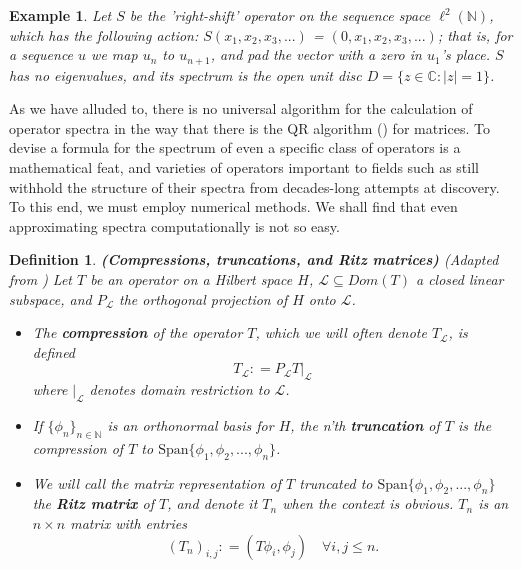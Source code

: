 \documentclass{article}
\newtheorem*{definition}{Definition}
\newtheorem{example}{Example}
\newcommand{\1}{\mathbf{1}} %
\newcommand{\eqdef}{\mathrel{\mathop:}=} %
\begin{document}
\begin{example}
Let $S$ be the 'right-shift' operator on the sequence space $\ell^2(\mathbb{N})$, which has the following action:
$S(x_1, x_2, x_3, ...)$ = $(0, x_1, x_2, x_3, ...)$; that is, for a sequence $u$ we map $u_n$ to $u_{n+1}$, and pad the vector with a zero in $u_1$'s place.
$S$ has no eigenvalues, and its spectrum is the open unit disc $D = \{z \in \mathbb{C} : |z| = 1\}$.
\end{example}

As we have alluded to, there is no universal algorithm for the calculation of operator spectra in the way that there is the QR algorithm (\parencite{francis1961qr}) for matrices. To devise a formula for the spectrum of even a specific class of operators is a mathematical
feat, and varieties of operators important to fields such as %
still withhold the structure of their spectra from decades-long attempts at discovery. To this end, we must employ numerical methods.
We shall find that even approximating spectra computationally is not so easy.

\begin{definition}{\textbf{(Compressions, truncations, and Ritz matrices)}}
(Adapted from \parencite{davies2004spectral})
Let $T$ be an operator on a Hilbert space $H$, $\mathcal{L} \subseteq Dom(T)$ a closed linear subspace, and $P_\mathcal{L}$ the orthogonal projection
of $H$ onto $\mathcal{L}$.
\begin{itemize}
\item The \textbf{compression} of the operator $T$, which we will often denote $T_\mathcal{L}$, is defined
$$T_\mathcal{L} \eqdef P_\mathcal{L} T\big|_{\mathcal{L}}$$
where $\big|_{\mathcal{L}}$ denotes domain restriction to $\mathcal{L}$.
\item If $\{\phi_n\}_{n \in \mathbb{N}}$ is an orthonormal basis for $H$, the n'th \textbf{truncation} of $T$ is the compression of $T$ to $\text{Span}\{\phi_1, \phi_2, ..., \phi_n\}$.
\item We will call the matrix representation of $T$ truncated to $\text{Span}\{\phi_1, \phi_2, ..., \phi_n\}$ the \textbf{Ritz matrix} of $T$,
and denote it $T_n$ when the context is obvious. $T_n$ is an $n \times n$ matrix with entries
$$(T_n)_{i,j}  \eqdef (T\phi_i, \phi_j) \quad \forall i, j \leq n.$$
\end{itemize}
\end{definition}
\end{document}
